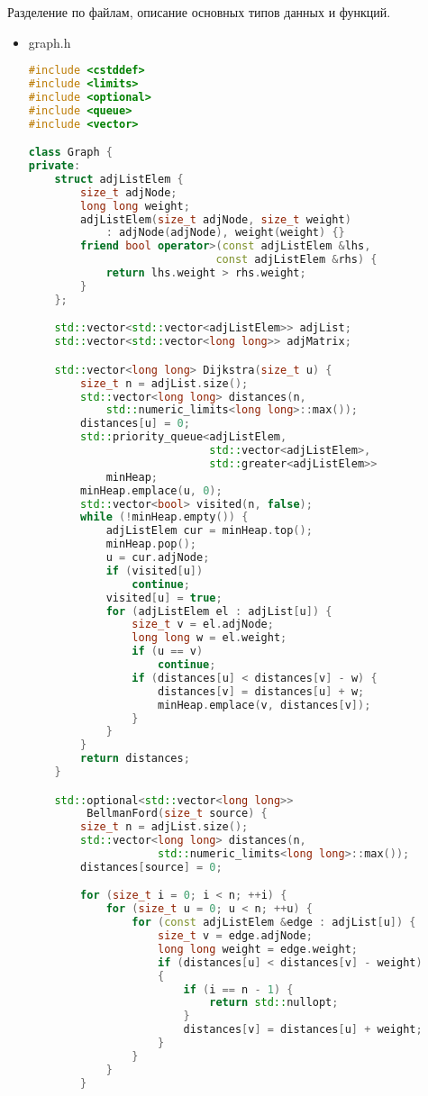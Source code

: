 \documentclass[12pt]{article}
\begin{document}
Разделение по файлам, описание основных типов данных и функций. 
\begin{itemize}
    \item
        graph.h
        \begin{lstlisting}[language=C++]
#include <cstddef>
#include <limits>
#include <optional>
#include <queue>
#include <vector>

class Graph {
private:
    struct adjListElem {
        size_t adjNode;
        long long weight;
        adjListElem(size_t adjNode, size_t weight)
            : adjNode(adjNode), weight(weight) {}
        friend bool operator>(const adjListElem &lhs,
                             const adjListElem &rhs) {
            return lhs.weight > rhs.weight;
        }
    };

    std::vector<std::vector<adjListElem>> adjList;
    std::vector<std::vector<long long>> adjMatrix;

    std::vector<long long> Dijkstra(size_t u) {
        size_t n = adjList.size();
        std::vector<long long> distances(n,
            std::numeric_limits<long long>::max());
        distances[u] = 0;
        std::priority_queue<adjListElem, 
                            std::vector<adjListElem>,
                            std::greater<adjListElem>>
            minHeap;
        minHeap.emplace(u, 0);
        std::vector<bool> visited(n, false);
        while (!minHeap.empty()) {
            adjListElem cur = minHeap.top();
            minHeap.pop();
            u = cur.adjNode;
            if (visited[u])
                continue;
            visited[u] = true;
            for (adjListElem el : adjList[u]) {
                size_t v = el.adjNode;
                long long w = el.weight;
                if (u == v)
                    continue;
                if (distances[u] < distances[v] - w) {
                    distances[v] = distances[u] + w;
                    minHeap.emplace(v, distances[v]);
                }
            }
        }
        return distances;
    }

    std::optional<std::vector<long long>>
         BellmanFord(size_t source) {
        size_t n = adjList.size();
        std::vector<long long> distances(n,
                    std::numeric_limits<long long>::max());
        distances[source] = 0;

        for (size_t i = 0; i < n; ++i) {
            for (size_t u = 0; u < n; ++u) {
                for (const adjListElem &edge : adjList[u]) {
                    size_t v = edge.adjNode;
                    long long weight = edge.weight;
                    if (distances[u] < distances[v] - weight) 
                    {
                        if (i == n - 1) {
                            return std::nullopt;
                        }
                        distances[v] = distances[u] + weight;
                    }
                }
            }
        }


\end{lstlisting}
\end{itemize}
\end{document}
